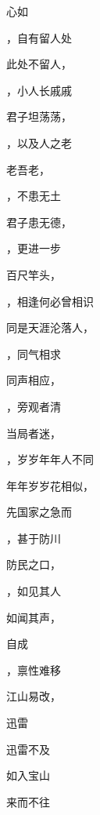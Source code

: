 \documentclass[12pt, a4paper, addpoints]{exam}
\begin{document}
\begin{multicols}{2}
\begin{questions}
\question[2] 心如\fillin

\question[2] \fillin，自有留人处

\question[2] 此处不留人，\fillin

\question[2] \fillin，小人长戚戚

\question[2] 君子坦荡荡，\fillin

\question[2] \fillin，以及人之老

\question[2] 老吾老，\fillin

\question[2] \fillin，不患无土

\question[2] 君子患无德，\fillin

\question[2] \fillin，更进一步

\question[2] 百尺竿头，\fillin

\question[2] \fillin，相逢何必曾相识

\question[2] 同是天涯沦落人，\fillin

\question[2] \fillin，同气相求

\question[2] 同声相应，\fillin

\question[2] \fillin，旁观者清

\question[2] 当局者迷，\fillin

\question[2] \fillin，岁岁年年人不同

\question[2] 年年岁岁花相似，\fillin

\question[2] 

\question[2] 先国家之急而\fillin

\question[2] \fillin，甚于防川

\question[2] 防民之口，\fillin

\question[2] \fillin，如见其人

\question[2] 如闻其声，\fillin

\question[2] 

\question[2] 自成\fillin

\question[2] \fillin，禀性难移

\question[2] 江山易改，\fillin

\question[2] 

\question[2] 迅雷

\question[2] 迅雷不及\fillin

\question[2] 

\question[2] 如入宝山\fillin

\question[2] 

\question[2] 来而不往\fillin

\question[2] 


\end{questions}
\end{multicols}
\end{document}
